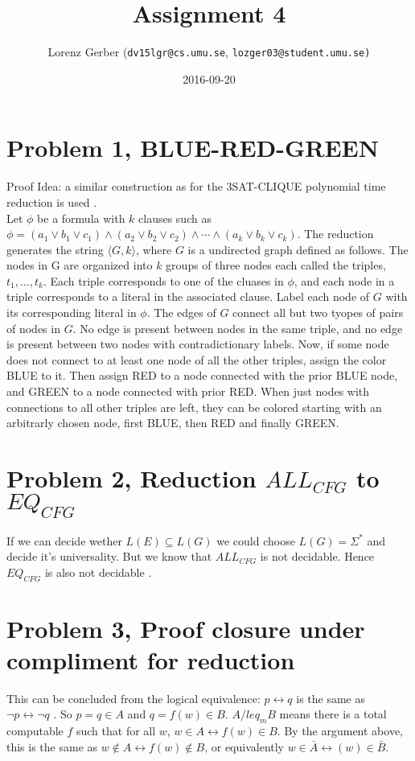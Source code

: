 \documentclass[a4paper,11pt,twoside]{article}
\title{Assignment 4}
\author{Lorenz Gerber ({\tt{dv15lgr@cs.umu.se}}, {\tt{lozger03@student.umu.se})}}
\date{2016-09-20}
\begin{document}
\lstset{language=C}
\maketitle
\thispagestyle{empty}
\newpage

\clearpage
{}

\section*{Problem 1, BLUE-RED-GREEN}
Proof Idea: a similar construction as for the 3SAT-CLIQUE polynomial time reduction is used \cite[chapter 7, p.302]{sipser2012}. \\
Let $\phi$ be a formula with $k$ clauses such as\\
$\phi = (a_{1} \lor b_{1} \lor c_{1}) \land (a_{2} \lor b_{2} \lor c_{2}) \land \dotsm \land (a_{k} \lor b_{k} \lor c_{k})$. The reduction generates the string $\langle G,k \rangle$, where $G$ is a undirected graph defined as follows.
The nodes in G are organized into $k$ groups of three nodes each called the triples, $t_{1}, \dotsc , t_{k}$. Each triple corresponds to one of the cluases in $\phi$, and each node in a triple corresponds to a literal in the associated clause. Label each node of $G$ with its corresponding literal in $\phi$. The edges of $G$ connect all but two tyopes of pairs of nodes in $G$. No edge is present between nodes in the same triple, and no edge is present between two nodes with contradictionary labels. Now, if some node does not connect to at least one node of all the other triples, assign the color BLUE to it. Then assign RED to a node connected with the prior BLUE node, and GREEN to a node connected with prior RED. When just nodes with connections to all other triples are left, they can be colored starting with an arbitrarly chosen node, first BLUE, then RED and finally GREEN. 


\section*{Problem 2, Reduction $ALL_{CFG}$ to $EQ_{CFG}$}
If we can decide wether $L(E) \subseteq L(G)$ we could choose $L(G) =
\Sigma^{*}$ and decide it's universality. But we know that $ALL_{CFG}$ is
not decidable. Hence $EQ_{CFG}$ is also not decidable \cite{universality}. 

\section*{Problem 3, Proof closure under compliment for reduction}
This can be concluded from the logical equivalence: $p \leftrightarrow q$ is the same as $\neg p \leftrightarrow \neg q$ \cite{mappingreduce}. So $p = q \in A$ and $q = f(w) \in B$. $A /leq_{m} B$ means there is a total computable $f$ such that for all $w$, $w \in A \leftrightarrow f(w) \in B$. By the argument above, this is the same as $w \notin A \leftrightarrow f(w) \notin B$, or equivalently $w \in \bar{A} \leftrightarrow(w) \in \bar{B}$.
\end{document}
